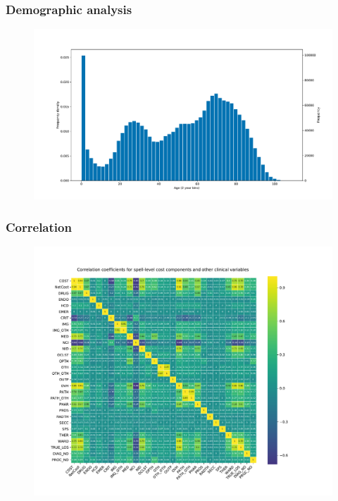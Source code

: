 \documentclass{beamer}
\begin{document}
\begin{frame}
    \frametitle{Demographic analysis}

    \begin{figure}
    \includegraphics[width=\linewidth]{./img/age_hist.pdf}
    \end{figure}
\end{frame}

\begin{frame}
    \frametitle{Correlation}

    \vspace{-15pt}
    \begin{figure}
    \includegraphics[width=\linewidth]{./img/corr_heatmap.pdf}
    \end{figure}
\end{frame}
\end{document}
